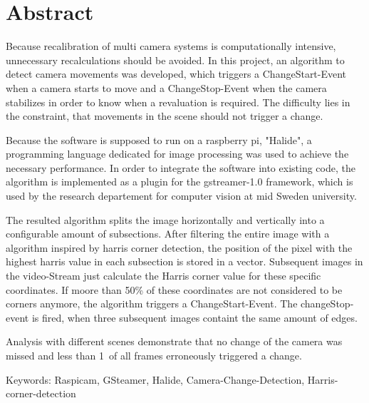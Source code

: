 \chapter{Abstract}
Because recalibration of multi camera systems is computationally intensive, unnecessary recalculations should be avoided. In this project, an algorithm to detect camera movements was developed, which triggers a ChangeStart-Event when a camera starts to move and a ChangeStop-Event when the camera stabilizes in order to know when a revaluation is required. The difficulty lies in the constraint, that movements in the scene should not trigger a change.\newline
 
Because the software is supposed to run on a raspberry pi,  "Halide", a programming language dedicated for image processing was used to achieve the necessary performance. In order to integrate the software into existing code, the algorithm is implemented as a plugin for the gstreamer-1.0 framework, which is used by the research departement for computer vision at mid Sweden university. \newline

The resulted algorithm splits the image horizontally and vertically into a configurable amount of subsections. After filtering the entire image with a algorithm inspired by harris corner detection, the position of the pixel with the highest harris value in each subsection is stored in a vector. Subsequent images in the video-Stream just calculate the Harris corner value for these specific coordinates. If moore than 50\% of these coordinates are not considered to be corners anymore, the algorithm triggers a ChangeStart-Event. The changeStop-event is fired, when three subsequent images containt the same amount of edges. \newline

Analysis with different scenes demonstrate that no change of the camera was missed and less than 1\textperthousand \ of all frames erroneously triggered a change.\newline

Keywords: Raspicam, GSteamer, Halide, Camera-Change-Detection, Harris-corner-detection